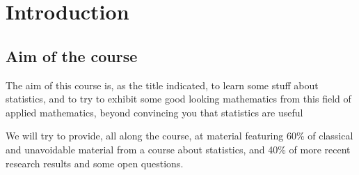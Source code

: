 \documentclass[
	fontsize=11pt, %
	twoside=false, %
	numbers=noenddot, %
]{kaobook}
\begin{document}









\mainmatter %


\setchapterpreamble[u]{\margintoc}
\chapter{Introduction}

\section{Aim of the course}

The aim of this course is, as the title indicated, to learn some stuff about statistics, and to try to exhibit some good looking mathematics from this field of applied mathematics, beyond convincing you that statistics are useful

We will try to provide, all along the course, at material featuring 60\% of classical and unavoidable material from a course about statistics, and 40\% of more recent research results and some open questions.
\end{document}
